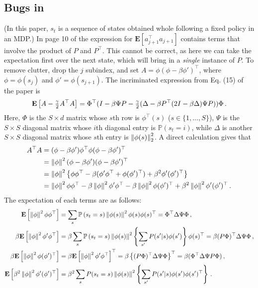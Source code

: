 \documentclass{article}
\newcommand{\Prob}[1]{\mathbb{P}\left(#1\right)}
\begin{document}
\subsection{Bugs in  \cite{lstdicmla}}
(In this paper, $s_t$ is a sequence of states obtained whole following a fixed policy in an MDP.)
In page 10 of \cite{lstdicmla} the expression for $\mathbf{E}[a_{j+1}^\top a_{j+1}]$ contains terms that involve the product of $P$ and $P^\top$. This cannot be correct, as here we can take the expectation first over the next state, which will bring in a \emph{single} instance of $P$.
To remove clutter, drop the $j$ subindex, and set $A = \phi(\phi- \beta \phi')^\top$, where $\phi  = \phi(s_{j})$ and $\phi' = \phi(s_{j+1})$.
The incriminated expression from Eq. (15) of the paper is
\begin{align}
\mathbf{E}\left[ A - \tfrac{\gamma}{2} A^\top A  \right] = \Phi^\top (I - \beta \Psi P - \tfrac{\gamma}{2}(\Delta - \beta P^\top (2I - \beta \Delta)\Psi P) ) \Phi\,.
\label{eq:bad1}
\end{align}
Here, $\Phi$ is the $S\times d$ matrix whose $s$th row is $\phi^\top(s)$ ($s\in \{1, \dots, S\}$),
$\Psi$ is the $S \times S$ diagonal matrix whose $i$th diagonal entry is $\Prob{s_t = i}$,  
while $\Delta$ is another $S\times S$ diagonal matrix whose $s$th entry is $\left\| \phi(s)\right\|_2^2$.
A direct calculation gives that
\begin{align}
A^\top A 
& = ( \phi-\beta \phi') \phi^\top \phi ( \phi-\beta \phi')^\top  \nonumber \\
& = \left\| \phi\right\|^2  ( \phi-\beta \phi') ( \phi-\beta \phi')^\top \nonumber \\
& = \left\| \phi\right\|^2  \left\{ \phi \phi^\top-\beta (\phi' \phi^\top + \phi (\phi')^\top) + \beta^2 \phi' (\phi')^\top \right\}\, \nonumber \\
& = \left\| \phi\right\|^2  \phi \phi^\top-\beta \left\| \phi\right\|^2 \phi' \phi^\top -\beta \left\| \phi\right\|^2  \phi (\phi')^\top + \beta^2 
\left\| \phi\right\|^2 \phi' (\phi')^\top\,.
\end{align}
The expectation of each terms are as follows:
\begin{align*}
\EE{\norm{\phi}^2  \phi \phi^\top } 
& = \sum_s \Prob{s_t = s}\norm{\phi(s)}^2 \phi(s) \phi(s)^\top = \Phi^\top \Delta \Psi \Phi\,,\\
\beta \EE{\norm{\phi}^2 \phi' \phi^\top } 
& = \beta \sum_s \Prob{s_t = s}\norm{\phi(s)}^2 \left\{ \sum_{s'}  P(s'|s) \phi(s')  \right\} \phi(s)^\top 
   = \beta (P \Phi)^\top \Delta \Psi \Phi\,,\\
\beta \EE{\norm{\phi}^2 \phi (\phi')^\top } 
& = \beta \EE{\norm{\phi}^2 \phi' \phi^\top }^\top
= \beta \left\{(P \Phi)^\top \Delta \Psi \Phi\right\}^\top 
=  \beta (\Phi^\top \Delta \Psi P \Phi) \,,\\
\EE{ \beta^2  \norm{\phi}^2 \phi' (\phi')^\top } 
& =\beta^2 \sum_s P(s_t=s) \norm{\phi(s)}^2 \left\{ \sum_{s'} P(s'|s) \phi(s') \phi(s')^\top \right\}\,.
\end{align*}
\end{document}
